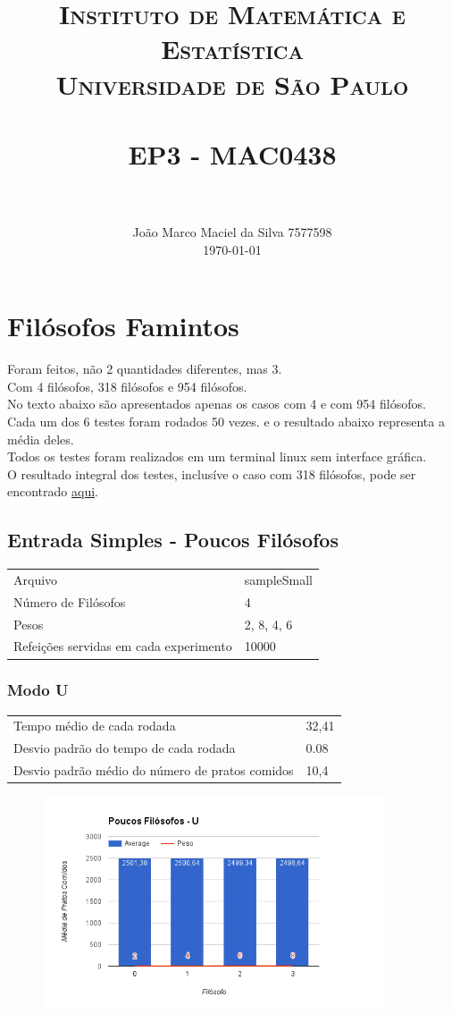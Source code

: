 \documentclass[paper=a4, fontsize=11pt]{scrartcl}
\title{
		\usefont{OT1}{bch}{b}{n}
		\normalfont \normalsize \textsc{Instituto de Matemática e Estatística\\Universidade de São Paulo} \\ [25pt]
		\horrule{0.5pt} \\[0.4cm]
		\huge EP3 - MAC0438 \\
		\horrule{2pt} \\[0.5cm]
}
\author{
		\normalfont 								\normalsize
        João Marco Maciel da Silva 7577598\\
        \normalsize
        \today
}
\date{}
\numberwithin{equation}{section}		%
\numberwithin{figure}{section}			%
\numberwithin{table}{section}				%
\begin{document}
\maketitle
\section{Filósofos Famintos}
	Foram feitos, não 2 quantidades diferentes, mas 3.\\
	Com 4 filósofos, 318 filósofos e 954 filósofos.\\
	No texto abaixo são apresentados apenas os casos com 4 e com 954 filósofos.
	Cada um dos 6 testes foram rodados 50 vezes. e o resultado abaixo representa a média deles.\\
	Todos os testes foram realizados em um terminal linux sem interface gráfica.\\
	O resultado integral dos testes, inclusíve o caso com 318 filósofos, pode ser encontrado \href{https://docs.google.com/spreadsheets/d/1JswsKe4sCJIXDUoLzpxeijnz9dtqEFNVYMwKC01sZhg/edit?usp=sharing}{aqui}.\\

\pagebreak
\subsection{Entrada Simples - Poucos Filósofos}
	\begin{tabular}{ll}
		Arquivo & sampleSmall\\
		Número de Filósofos& 4\\
		Pesos& 2, 8, 4, 6\\
		Refeições servidas em cada experimento& 10000\\
	\end{tabular}

\subsubsection{Modo U}
	\begin{tabular}{ll}
		Tempo médio de cada rodada& 32,41\\
		Desvio padrão do tempo de cada rodada& 0.08\\
		Desvio padrão médio do número de pratos comidos& 10,4\\
	\end{tabular}

	\begin{figure}[H]
		\centering
		\includegraphics[width=0.9\textwidth]{image5}
		\caption{}
		\label{image5}
	\end{figure}
\end{document}
